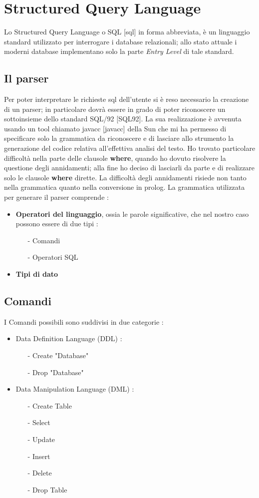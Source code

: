 \section{Structured Query Language}

Lo Structured Query Language o SQL [sql] in forma abbreviata, è un linguaggio standard utilizzato per interrogare i database relazionali; allo stato attuale i moderni database implementano solo la parte \emph{Entry Level} di tale standard. 

\subsection{Il parser}
Per poter interpretare le richieste sql dell'utente si è reso necessario la creazione di un parser; in particolare dovrà essere in grado di poter riconoscere un sottoinsieme dello standard SQL/92 [SQL92]. La sua realizzazione è avvenuta usando un tool chiamato javacc [javacc] della Sun che mi ha permesso di specificare solo la grammatica da riconoscere e di lasciare allo strumento la generazione del codice relativa all'effettiva analisi del testo. Ho trovato particolare difficoltà nella parte delle clausole {\bf where}, quando ho dovuto risolvere la questione degli annidamenti; alla fine ho deciso di lasciarli da parte e di realizzare solo le clausole {\bf where} dirette. La difficoltà degli annidamenti risiede non tanto nella grammatica quanto nella conversione in prolog. La grammatica utilizzata per generare il parser comprende :
\begin{itemize}
\item {\bf Operatori del linguaggio}, ossia le parole significative, che nel nostro caso possono essere di due tipi : 
\begin{itemize}
\item[-] Comandi
\item[-] Operatori SQL
\end{itemize}
\item {\bf Tipi di dato}
\end{itemize}

\subsection{Comandi}
I Comandi possibili sono suddivisi in due categorie :
\begin{itemize}
\item Data Definition Language (DDL) :
\begin{itemize}
\item[-] Create "Database"
\item[-] Drop "Database"
\end{itemize}
\item Data Manipulation Language (DML) :
\begin{itemize}
\item[-] Create Table
\item[-] Select
\item[-] Update
\item[-] Insert 
\item[-] Delete
\item[-] Drop Table
\end{itemize}
\end{itemize}

